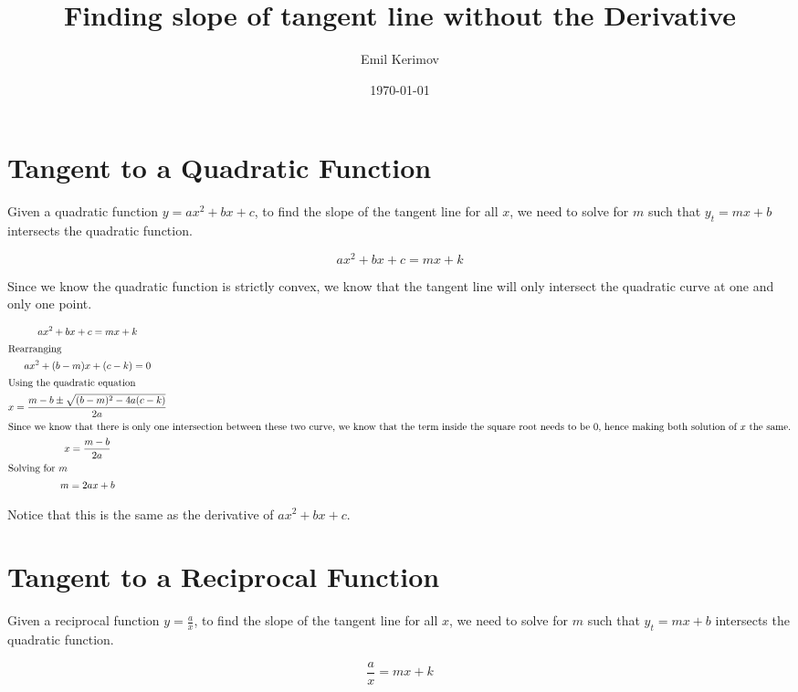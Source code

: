 \documentclass[a4paper]{article}
\title{Finding slope of tangent line without the Derivative}
\author{Emil Kerimov}
\date{\today}
\begin{document}
\maketitle

\section{Tangent to a Quadratic Function}\label{std:sec:a-quadratic-function}

Given a quadratic function $ y = ax^2 + bx + c$, to find the slope of the tangent line for all $x$, we need to solve for $m$ such that $y_t = mx+b$ intersects the quadratic function.

\begin{equation}
ax^2 + bx + c = mx+k \label{std:eq:equation}
\end{equation}

Since we know the quadratic function is strictly convex, we know that the tangent line will only intersect the quadratic curve at one and only one point.

\begin{gather*}
ax^2 + bx + c = mx+k\\
\shortintertext{Rearranging}
ax^2 + (b-m)x + (c-k) = 0\\
\shortintertext{Using the quadratic equation}
x = \frac{m-b \pm \sqrt{(b-m)^2 - 4a(c-k)}}{2a}\\
\shortintertext{Since we know that there is only one intersection between these two curve, we know that the term inside the square root needs to be $0$, hence making both solution of $x$ the same.}
x = \frac{m-b}{2a}\\
\shortintertext{Solving for $m$}
 m = 2ax +b \\
\end{gather*}

Notice that this is the same as the derivative of $ax^2 + bx +c$.

\section{Tangent to a Reciprocal Function}\label{std:sec:a-reciprocal-function}
Given a reciprocal function $ y = \frac{a}{x}$, to find the slope of the tangent line for all $x$, we need to solve for $m$ such that $y_t = mx+b$ intersects the quadratic function.

\begin{equation}
\frac{a}{x} = mx+k \label{std:eq:equation2}
\end{equation}
\end{document}
